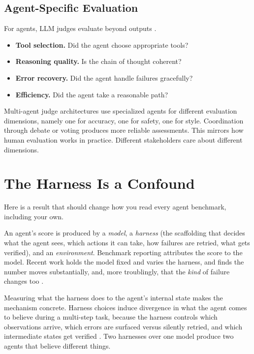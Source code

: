 \subsection{Agent-Specific Evaluation}

For agents, LLM judges evaluate beyond outputs \cite{arizellmjudge2025}.
\begin{itemize}
\item \textbf{Tool selection.} Did the agent choose appropriate tools?
\item \textbf{Reasoning quality.} Is the chain of thought coherent?
\item \textbf{Error recovery.} Did the agent handle failures gracefully?
\item \textbf{Efficiency.} Did the agent take a reasonable path?
\end{itemize}

Multi-agent judge architectures \cite{multiagentjudge2025} use specialized agents for different evaluation dimensions, namely one for accuracy, one for safety, one for style. Coordination through debate or voting produces more reliable assessments. This mirrors how human evaluation works in practice. Different stakeholders care about different dimensions.

\section{The Harness Is a Confound}
\label{sec:harness}

Here is a result that should change how you read every agent benchmark, including
your own.

An agent's score is produced by a \emph{model}, a \emph{harness} (the scaffolding
that decides what the agent sees, which actions it can take, how failures are
retried, what gets verified), and an \emph{environment}. Benchmark reporting
attributes the score to the model. Recent work holds the model fixed and varies
the harness, and finds the number moves substantially, and, more troublingly,
that the \emph{kind} of failure changes too \cite{modelharness2026, uniace2026}.

Measuring what the harness does to the agent's internal state makes the mechanism
concrete. Harness choices induce divergence in what the agent comes to believe
during a multi-step task, because the harness controls which observations arrive,
which errors are surfaced versus silently retried, and which intermediate states
get verified \cite{harnessdiverge2026}. Two harnesses over one model produce two
agents that believe different things.

